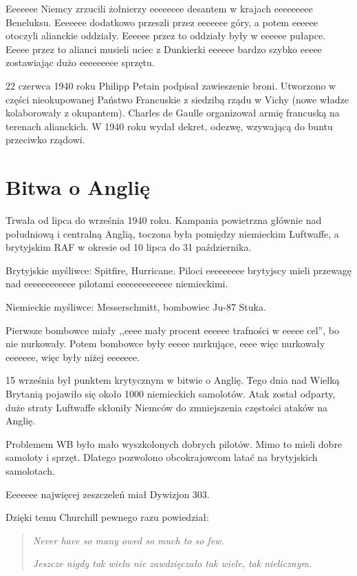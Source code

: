 \documentclass [a4paper, 11pt, oneside]{book}
\begin{document}
Eeeeeee Niemcy zrzucili żołnierzy eeeeeeee desantem w krajach eeeeeeeee Beneluksu. Eeeeeee dodatkowo przeszli przez eeeeeee góry, a potem eeeeee otoczyli alianckie oddziały. Eeeeee przez to oddziały były w eeeeee pułapce. Eeeee przez to alianci musieli uciec z Dunkierki eeeeee bardzo szybko eeeee zostawiając dużo eeeeeeeee sprzętu.

22 czerwca 1940 roku Philipp Petain podpisał zawieszenie broni. Utworzono w części nieokupowanej Państwo Francuskie z siedzibą rządu w Vichy (nowe władze kolaborowały z okupantem). Charles de Gaulle organizował armię francuską na terenach alianckich. W 1940 roku wydał dekret, odezwę, wzywającą do buntu przeciwko rządowi.

\section{Bitwa o Anglię}

Trwała od lipca do września 1940 roku. Kampania powietrzna głównie nad południową i centralną Anglią, toczona była pomiędzy niemieckim Luftwaffe, a brytyjskim RAF w okresie od 10 lipca do 31 października.

Brytyjskie myśliwce: Spitfire, Hurricane. Piloci eeeeeeeee brytyjscy mieli przewagę nad eeeeeeeeeeee pilotami eeeeeeeeeeeee niemieckimi.

Niemieckie myśliwce: Messerschmitt, bombowiec Ju-87 Stuka.

Pierwsze bombowce miały ,,eeee mały procent eeeeee trafności w eeeee cel'', bo nie nurkowały. Potem bombowce były eeeee nurkujące, eeee więc nurkowały eeeeeee, więc były niżej eeeeeee.

15 września był punktem krytycznym w bitwie o Anglię. Tego dnia nad Wielką Brytanią pojawiło się około 1000 niemieckich samolotów. Atak został odparty, duże straty Luftwaffe skłoniły Niemców do zmniejszenia częstości ataków na Anglię.

Problemem WB było mało wyszkolonych dobrych pilotów. Mimo to mieli dobre samoloty i sprzęt. Dlatego pozwolono obcokrajowcom latać na brytyjskich samolotach.

Eeeeeee najwięcej zeszczeleń miał Dywizjon 303.

Dzięki temu Churchill pewnego razu powiedział:

\begin{center}
\begin{quote}
\emph{Never have so many owed so much to so few.}

\emph{Jeszcze nigdy tak wielu nie zawdzięczało tak wiele, tak nielicznym.}
\end{quote}
\end{center}
\end{document}
